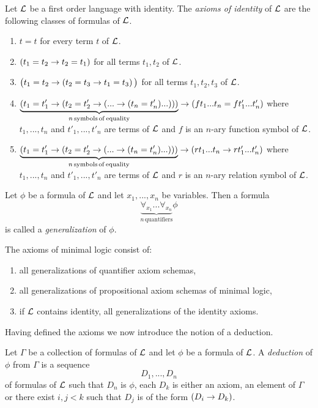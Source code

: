 \documentclass[10pt]{amsart}
\begin{document}
\begin{definition}
	Let ${\mathcal L}$ be a first order language with identity. The \textit{axioms of identity} of ${\mathcal L}$ are the following classes of formulas of ${\mathcal L}$.
	\begin{enumerate}[label=\textbf{\arabic*.}]
		\item $t = t$ for every term $t$ of ${\mathcal L}$.
		\item $(t_1 = t_2 \rightarrow t_2 = t_1)$ for all terms $t_1,t_2$ of ${\mathcal L}$.
		\item $\big(t_1 = t_2 \rightarrow \left(t_2 = t_3\rightarrow t_1 = t_3\right)\big)$ for all terms $t_1,t_2,t_3$ of ${\mathcal L}$.
		\item $\underbrace{\left(t_1 = t'_1 \rightarrow \left( t_2 = t'_2 \rightarrow \left(... \rightarrow (t_n = t'_n)...\right)\right)\right)}_{n\,\mathrm{symbols\,of\,equality}} \rightarrow \left(ft_1...t_n = ft'_1...t'_n\right)$ where $t_1,...,t_n$ and $t'_1,...,t'_n$ are terms of ${\mathcal L}$ and $f$ is an $n$-ary function symbol of ${\mathcal L}$.
		\item $\underbrace{\left(t_1 = t'_1 \rightarrow \left( t_2 = t'_2 \rightarrow \left(... \rightarrow (t_n = t'_n)...\right)\right)\right)}_{n\,\mathrm{symbols\,of\,equality}} \rightarrow \left(rt_1...t_n \rightarrow rt'_1...t'_n\right)$ where $t_1,...,t_n$ and $t'_1,...,t'_n$ are terms of ${\mathcal L}$ and $r$ is an $n$-ary relation symbol of ${\mathcal L}$.
	\end{enumerate}
\end{definition}

\begin{definition}
	Let $\phi$ be a formula of ${\mathcal L}$ and let $x_1,...,x_n$ be variables. Then a formula
	$$\underbrace{\forall_{x_1} ...\forall_{x_n}}_{n\,\mathrm{quantifiers}} \phi$$
	is called a \textit{generalization} of $\phi$.
\end{definition}

\begin{definition}
	The axioms of minimal logic consist of:
	\begin{enumerate}[label=\textbf{\arabic*.}]
		\item all generalizations of quantifier axiom schemas,
		\item all generalizations of propositional axiom schemas of minimal logic,
		\item if ${\mathcal L}$ contains identity, all generalizations of the identity axioms.
	\end{enumerate}
\end{definition}
\noindent
Having defined the axioms we now introduce the notion of a deduction. 

\begin{definition}
	Let $\Gamma$ be a collection of formulas of ${\mathcal L}$ and let $\phi$ be a formula of ${\mathcal L}$. A \textit{deduction} of $\phi$ from $\Gamma$ is a sequence
	$$D_1 , ..., D_n$$
	of formulas of ${\mathcal L}$ such that $D_n$ is $\phi$, each $D_k$ is either an axiom, an element of $\Gamma$ or there exist $i, j < k$ such that $D_j$ is of the form $(D_i \rightarrow D_k)$.
\end{definition}
\end{document}
